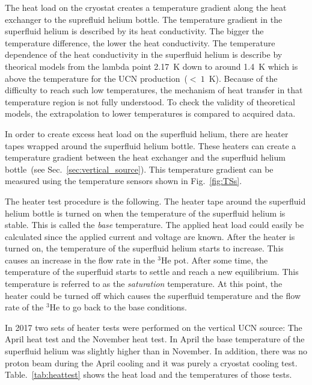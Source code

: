 The heat load on the cryostat creates a temperature gradient along the
heat exchanger to the suprefluid helium bottle. The temperature
gradient in the superfluid helium is described by its heat
conductivity. The bigger the temperature difference, the lower the
heat conductivity. The temperature dependence of the heat conductivity
in the superfluid helium is describe by theorical models from the
lambda point 2.17~K down to around 1.4~K which is above the
temperature for the UCN production~($<~1$~K).  Because of the
difficulty to reach such low temperatures, the mechanism of heat
transfer in that temperature region is not fully understood.  To check
the validity of theoretical models, the extrapolation to lower
temperatures is compared to acquired data.


In order to create excess heat load on the superfluid helium, there
are heater tapes wrapped around the superfluid helium bottle. These
heaters can create a temperature gradient between the heat exchanger
and the superfluid helium bottle~(see
Sec.~\ref{sec:vertical_source}). This temperature gradient can be
measured using the temperature sensors shown in Fig.~\ref{fig:TSs}.

The heater test procedure is the following. The heater tape around the
superfluid helium bottle is turned on when the temperature of the
superfluid helium is stable. This is called the {\it{base}}
temperature. The applied heat load could easily be calculated since
the applied current and voltage are known. After the heater is turned
on, the temperature of the superfluid helium starts to increase. This
causes an increase in the flow rate in the $^3$He pot. After some time,
the temperature of the superfluid starts to settle and reach a new
equilibrium. This temperature is referred to as the
{\it{saturation}} temperature. At this point, the heater could be
turned off which causes the superfluid temperature and the flow rate
of the $^3$He to go back to the base conditions.

In 2017 two sets of heater tests were performed on the vertical UCN
source: The April heat test and the November heat test. In April the
base temperature of the superfluid helium was slightly higher than in
November. In addition, there was no proton beam during the April
cooling and it was purely a cryostat cooling
test. Table.~\ref{tab:heattest} shows the heat load and the
temperatures of those tests.

